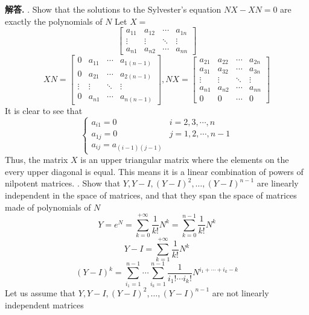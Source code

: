\documentclass[12pt, a4paper, oneside]{article}
\newenvironment{solution}{\par\noindent\textbf{解答. }}{\par}
\begin{document}
\begin{CJK}{UTF8}{gbsn}
\begin{solution} . Show that the solutions to the Sylvester's equation $NX-XN=0$ are exactly the polynomials of $N$ \newline
  Let $X = $ 
  $$ \begin{bmatrix}
    a_{11} & a_{12} & \cdots & a_{1n} \\
    \vdots & \vdots & \ddots & \vdots \\
    a_{n1} & a_{n2} & \cdots & a_{nn}
  \end{bmatrix}$$ 
  $$ XN = \begin{bmatrix}
    0 & a_{11} & \cdots & a_{1(n-1)} \\
    0 & a_{21} & \cdots & a_{2(n-1)} \\
    \vdots & \vdots & \ddots & \vdots \\
    0 & a_{n1} & \cdots & a_{n(n-1)}
  \end{bmatrix}, NX = \begin{bmatrix}
    a_{21} & a_{22} & \cdots & a_{2n} \\
    a_{31} & a_{32} & \cdots & a_{3n} \\
    \vdots & \vdots & \ddots & \vdots \\
    a_{n1} & a_{n2} & \cdots & a_{nn} \\
    0 & 0 & \cdots & 0
  \end{bmatrix}$$ 
  It is clear to see that 
  $$ \begin{cases}
    a_{i1} = 0 & i = 2,3,\cdots,n \\
    a_{1j} = 0 & j = 1,2,\cdots,n-1 \\
    a_{ij} = a_{(i-1)(j-1)} & 
  \end{cases}$$
  Thus, the matrix $X$ is an upper triangular matrix where the elements on the every upper diagonal is equal. This means it is a linear combination of powers of nilpotent matrices. . Show that $Y,Y-I,(Y-I)^2,\dots,(Y-I)^{n-1}$ are linearly independent in the space of  matrices, and that they span the space of matrices made of polynomials of $N$ \newline
  $$ Y = e^N = \sum_{k=0}^{+\infty}\frac{1}{k!}N^k = \sum_{k=0}^{n-1}\frac{1}{k!}N^k $$ 
  $$ Y - I = \sum_{k=1}^{+\infty}\frac{1}{k!}N^k $$ 
  $$ (Y - I)^k = \sum_{i_1=1}^{n-1}\cdots\sum_{i_k=1}^{n-1}\frac{1}{i_1!\cdots i_k!}N^{i_1+\cdots+i_k - k} $$ 
  Let us assume that $Y,Y-I,(Y-I)^2,\dots,(Y-I)^{n-1}$ are not linearly independent matrices \newline

\end{solution}
\end{CJK}
\end{document}
